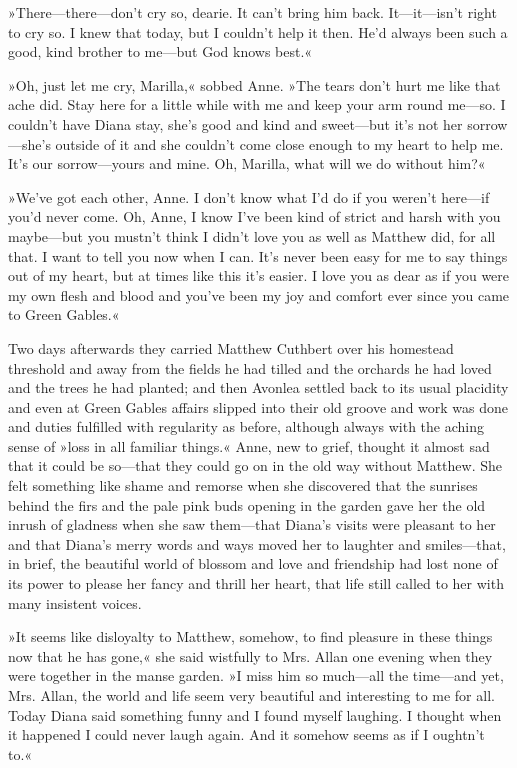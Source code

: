 »There—there—don't cry so, dearie. It can't bring him back. It—it—isn't right to cry so. I knew that today, but I couldn't help it then. He'd always been such a good, kind brother to me—but God knows best.«

»Oh, just let me cry, Marilla,« sobbed Anne. »The tears don't hurt me like that ache did. Stay here for a little while with me and keep your arm round me—so. I couldn't have Diana stay, she's good and kind and sweet—but it's not her sorrow—she's outside of it and she couldn't come close enough to my heart to help me. It's our sorrow—yours and mine. Oh, Marilla, what will we do without him?«

»We've got each other, Anne. I don't know what I'd do if you weren't here—if you'd never come. Oh, Anne, I know I've been kind of strict and harsh with you maybe—but you mustn't think I didn't love you as well as Matthew did, for all that. I want to tell you now when I can. It's never been easy for me to say things out of my heart, but at times like this it's easier. I love you as dear as if you were my own flesh and blood and you've been my joy and comfort ever since you came to Green Gables.«

Two days afterwards they carried Matthew Cuthbert over his homestead threshold and away from the fields he had tilled and the orchards he had loved and the trees he had planted; and then Avonlea settled back to its usual placidity and even at Green Gables affairs slipped into their old groove and work was done and duties fulfilled with regularity as before, although always with the aching sense of »loss in all familiar things.« Anne, new to grief, thought it almost sad that it could be so—that they could go on in the old way without Matthew. She felt something like shame and remorse when she discovered that the sunrises behind the firs and the pale pink buds opening in the garden gave her the old inrush of gladness when she saw them—that Diana's visits were pleasant to her and that Diana's merry words and ways moved her to laughter and smiles—that, in brief, the beautiful world of blossom and love and friendship had lost none of its power to please her fancy and thrill her heart, that life still called to her with many insistent voices.

»It seems like disloyalty to Matthew, somehow, to find pleasure in these things now that he has gone,« she said wistfully to Mrs. Allan one evening when they were together in the manse garden. »I miss him so much—all the time—and yet, Mrs. Allan, the world and life seem very beautiful and interesting to me for all. Today Diana said something funny and I found myself laughing. I thought when it happened I could never laugh again. And it somehow seems as if I oughtn't to.«

